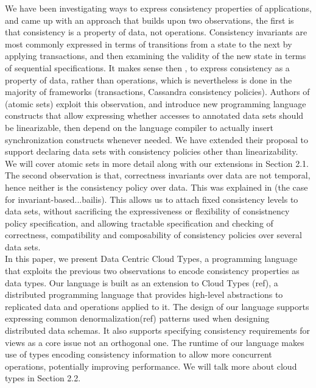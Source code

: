 We have been investigating ways to express consistency properties of
applications, and came up with an approach that builds upon two observations, the
first is that consistency is a property of data, not operations. Consistency
invariants are most commonly expressed in terms of transitions from a state to the
next by applying transactions, and then examining the validity of the new state
in terms of sequential specifications. It makes sense then , to express 
consistency as a property of data, rather than
operations, which is nevertheless is done in the majority of frameworks (transactions, Cassandra
consistency policies). Authors of (atomic sets) exploit this observation, and
introduce new programming language constructs that allow expressing whether
accesses to annotated data sets should be linearizable, then depend on the language compiler to
actually insert synchronization constructs whenever needed. We have extended
their proposal to support declaring data sets with consistency policies other
than linearizability. We will cover atomic sets in more detail along with our
extensions in Section 2.1. \\
The second observation is that, correctness invariants over data are not temporal, hence
neither is the consistency policy over data. This was explained in (the case for
invariant-based...bailis). This allows us to attach fixed consistency levels to
data sets, without sacrificing the expressiveness or flexibility of consistnency
policy specification, and allowing tractable specification and checking of
correctness, compatibility and composability of consistency policies over
several data sets. \\

In this paper, we present Data Centric Cloud Types, a programming language that
exploits the previous two observations to encode consistency properties as data
types. Our language is built as an extension to Cloud Types (ref), 
a distributed programming language that provides high-level abstractions to replicated
data and operations applied to it. The design of our language supports
expressing common denormalization(ref) patterns used when designing distributed
data schemas. It also supports specifying consistency requirements for views as
a core issue not an orthogonal one. The runtime of our language makes use of
types encoding 
consistency information to allow more concurrent operations, potentially
improving performance. We will talk more about cloud types in Section 2.2. \\

